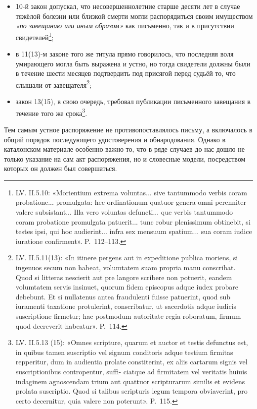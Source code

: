 \begin{itemize}
\item 10-й закон допускал, что несовершеннолетние старше десяти лет в случае тяжёлой болезни или близкой смерти могли распорядиться своим имуществом \emph{«по завещанию или иным образом»} как письменно, так и в присутствии свидетелей\footnote{LV. II.5.10: «Morientium extrema voluntas... sive tantummodo verbis coram probatione... promulgata: hec ordinationum quatuor genera omni perenniter valere subsistant... Illa vero voluntas defuncti... que verbis tantummodo coram probatione promulgata patuerit... tunc robur plenissimum obtinebit, si testes ipsi, qui hoc audierint... infra sex mensuum spatium... sua coram iudice iuratione confirment». P.~112--113.};
\item в 11(13)-м законе того же титула прямо говорилось, что последняя воля умирающего могла быть выражена и устно, но тогда свидетели должны были в течение шести месяцев подтвердить под присягой перед судьёй то, что слышали от завещателя\footnote{LV. II.5.11(13): «In itinere pergens aut in expeditione publica moriens, si ingenuos secum non habeat, volumtatem suam propria manu conscribat. Quod si litteras nescierit aut pre langore scribere non potuerit, eandem volumtatem servis insinuet, quorum fidem episcopus adque iudex probare debebunt. Et si nullatenus antea fraudulenti fuisse patuerint, quod sub iuramenti taxatione protulerint, conscribatur, ut sacerdotis adque iudicis suscriptione firmetur; hac postmodum autoritate regia roboratum, firmum quod decreverit habeatur». P.~114.};
\item закон 13(15), в свою очередь, требовал публикации письменного завещания в течение того же срока\footnote{LV. II.5.13 (15): «Omnes scripture, quarum et auctor et testis defunctus est, in quibus tamen suscriptio vel signum conditoris adque testium firmitas repperitur, dum in audientia prolate constiterint, ex aliis cartarum signis vel suscriptionibus contropentur, suffi- ciatque ad firmitatem vel veritatis huiuis indaginem agnoscendam trium aut quattuor scripturarum similis et evidens prolata suscriptio. Quod si talibus scripturis legum tempora obviaverint, pro certo decernitur, quia valere non poterunt». P.~115.}.
\end{itemize}
Тем самым устное распоряжение не противопоставлялось письму, а включалось в общий порядок последующего удостоверения и обнародования. Однако в каталонском материале особенно важно то, что в ряде случаев до нас дошло не только указание на сам акт распоряжения, но и словесные модели, посредством которых он должен был совершаться.

